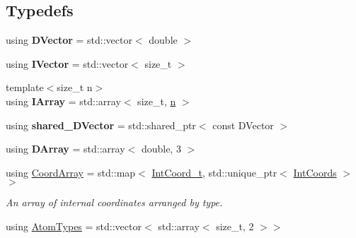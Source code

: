 \subsection*{Typedefs}
\begin{DoxyCompactItemize}
\item 
using {\bfseries D\+Vector} = std\+::vector$<$ double $>$\hypertarget{namespaceFManII_a7f89f8915272399dda44b281ae39a94a}{}\label{namespaceFManII_a7f89f8915272399dda44b281ae39a94a}

\item 
using {\bfseries I\+Vector} = std\+::vector$<$ size\+\_\+t $>$\hypertarget{namespaceFManII_a314ed8350c41700525e12966212980e9}{}\label{namespaceFManII_a314ed8350c41700525e12966212980e9}

\item 
{\footnotesize template$<$size\+\_\+t n$>$ }\\using {\bfseries I\+Array} = std\+::array$<$ size\+\_\+t, \hyperlink{namespaceFManII_ab331802fde4c5f2564443f1704c25363a351f38f2149aa0e3be56f7c5aa16eae9}{n} $>$\hypertarget{namespaceFManII_a8360f8defc13d25e7131179fcd33ffd2}{}\label{namespaceFManII_a8360f8defc13d25e7131179fcd33ffd2}

\item 
using {\bfseries shared\+\_\+\+D\+Vector} = std\+::shared\+\_\+ptr$<$ const D\+Vector $>$\hypertarget{namespaceFManII_ab3ad101443820b6b8a263fdccb2aaae3}{}\label{namespaceFManII_ab3ad101443820b6b8a263fdccb2aaae3}

\item 
using {\bfseries D\+Array} = std\+::array$<$ double, 3 $>$\hypertarget{namespaceFManII_af7bb56e0807edff7d188ff037a09d35f}{}\label{namespaceFManII_af7bb56e0807edff7d188ff037a09d35f}

\item 
using \hyperlink{namespaceFManII_a988516dba14437f483faf9f3c6d40c25}{Coord\+Array} = std\+::map$<$ \hyperlink{namespaceFManII_aee2b0c5668a8970ffb58ac650994e059}{Int\+Coord\+\_\+t}, std\+::unique\+\_\+ptr$<$ \hyperlink{classFManII_1_1IntCoords}{Int\+Coords} $>$$>$\hypertarget{namespaceFManII_a988516dba14437f483faf9f3c6d40c25}{}\label{namespaceFManII_a988516dba14437f483faf9f3c6d40c25}

\begin{DoxyCompactList}\small\item\em An array of internal coordinates arranged by type. \end{DoxyCompactList}\item 
using \hyperlink{namespaceFManII_add1cccdf9425a71de6835b2631b84db8}{Atom\+Types} = std\+::vector$<$ std\+::array$<$ size\+\_\+t, 2 $>$$>$\hypertarget{namespaceFManII_add1cccdf9425a71de6835b2631b84db8}{}\label{namespaceFManII_add1cccdf9425a71de6835b2631b84db8}


\end{DoxyCompactItemize}
